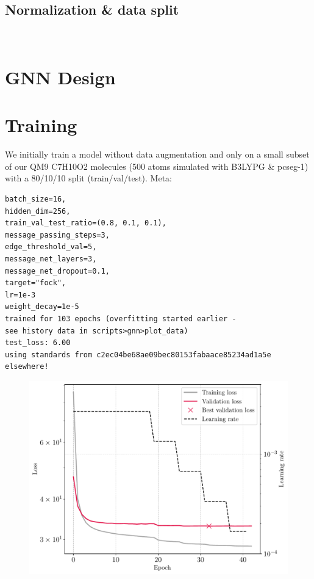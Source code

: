 \subsection{Normalization \& data split}
\label{subsec:gnn_normalization}

\

\section{GNN Design}
\label{sec:gnn_design}

\section{Training}
\label{sec:gnn_training}
We initially train a model without data augmentation and only on a small subset of our QM9 C7H10O2 molecules (500 atoms simulated with B3LYPG \& pcseg-1) with a 80/10/10 split (train/val/test). 
Meta: 
\begin{verbatim}
batch_size=16,
hidden_dim=256,
train_val_test_ratio=(0.8, 0.1, 0.1),
message_passing_steps=3,
edge_threshold_val=5,
message_net_layers=3,
message_net_dropout=0.1,
target="fock",
lr=1e-3 
weight_decay=1e-5
trained for 103 epochs (overfitting started earlier - 
see history data in scripts>gnn>plot_data)
test_loss: 6.00
using standards from c2ec04be68ae09bec80153fabaace85234ad1a5e elsewhere!
\end{verbatim}
        
\begin{figure}[H]
    \centering
    \includegraphics[width=\textwidth]{../fig/gnn/mgnn_pcseg1_simple_loss.pdf}
    \caption[GNN initial training Loss]{}
    \label{fig:gnn_initial_training_loss}
\end{figure}